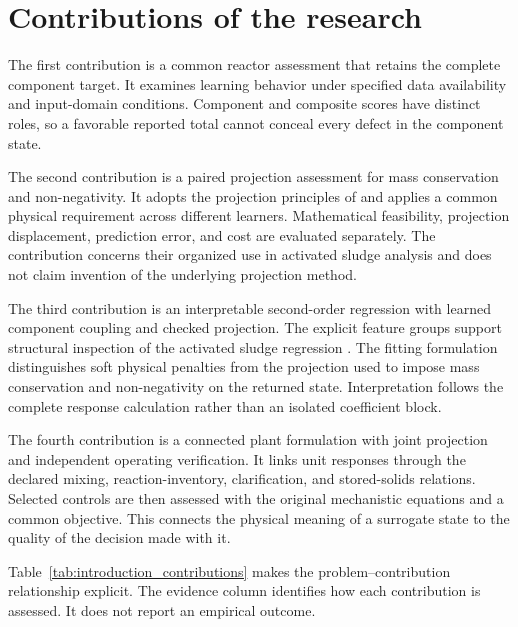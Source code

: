 \section{Contributions of the research}

The first contribution is a common reactor assessment that retains the complete component target. It examines learning behavior under specified data availability and input-domain conditions. Component and composite scores have distinct roles, so a favorable reported total cannot conceal every defect in the component state.

The second contribution is a paired projection assessment for mass conservation and non-negativity. It adopts the projection principles of \citet{KircherVotsmeier2025} and applies a common physical requirement across different learners. Mathematical feasibility, projection displacement, prediction error, and cost are evaluated separately. The contribution concerns their organized use in activated sludge analysis and does not claim invention of the underlying projection method.

The third contribution is an interpretable second-order regression with learned component coupling and checked projection. The explicit feature groups support structural inspection of the activated sludge regression \citep{Selerio2026}. The fitting formulation distinguishes soft physical penalties from the projection used to impose mass conservation and non-negativity on the returned state. Interpretation follows the complete response calculation rather than an isolated coefficient block.

The fourth contribution is a connected plant formulation with joint projection and independent operating verification. It links unit responses through the declared mixing, reaction-inventory, clarification, and stored-solids relations. Selected controls are then assessed with the original mechanistic equations and a common objective. This connects the physical meaning of a surrogate state to the quality of the decision made with it.

Table~\ref{tab:introduction_contributions} makes the problem--contribution relationship explicit. The evidence column identifies how each contribution is assessed. It does not report an empirical outcome.

